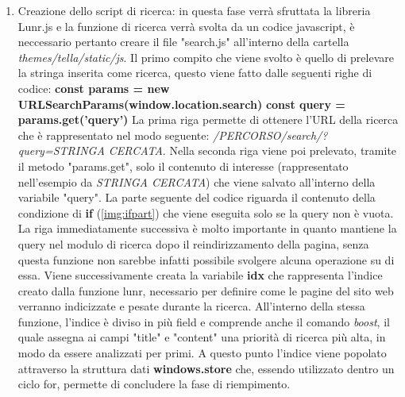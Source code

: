 \documentclass[target=bach,aauheader=]{thud}
\begin{document}
\begin{enumerate}
    \item Creazione dello script di ricerca: in questa fase verrà sfruttata la libreria Lunr.js e la funzione di ricerca verrà svolta da un codice javascript, è neccessario pertanto creare il file "search.js" all'interno della cartella \textit{themes/tella/static/js}.
    \newline \newline 
    Il primo compito che viene svolto è quello di prelevare la stringa inserita come ricerca, questo viene fatto dalle seguenti righe di codice:
    \newline \newline
    \textbf{const params = new URLSearchParams(window.location.search)}
    \newline
    \textbf{const query = params.get('query')}
    \newline \newline
    La prima riga permette di ottenere l'URL della ricerca che è rappresentato nel modo seguente: \textit{/PERCORSO/search/?query=STRINGA CERCATA}.
    \newline
    Nella seconda riga viene poi prelevato, tramite il metodo "params.get", solo il contenuto di interesse (rappresentato nell'esempio da \textit{STRINGA CERCATA}) che viene salvato all'interno della variabile "query".
    \newline \newline
    La parte seguente del codice riguarda il contenuto della condizione di \textbf{if} (\cref{img:ifpart}) che viene eseguita solo se la query non è vuota. La riga immediatamente successiva è molto importante in quanto mantiene la query nel modulo di ricerca dopo il reindirizzamento della pagina, senza questa funzione non sarebbe infatti possibile svolgere alcuna operazione su di essa.
    \newline
    Viene successivamente creata la variabile \textbf{idx} che rappresenta l'indice creato dalla funzione lunr, necessario per definire come le pagine del sito web verranno indicizzate e pesate durante la ricerca.
    \newline
    All'interno della stessa funzione, l'indice è diviso in più field e comprende anche il comando \textit{boost}, il quale assegna ai campi "title" e "content" una priorità di ricerca più alta, in modo da essere analizzati per primi.  
    \newline
    A questo punto l'indice viene popolato attraverso la struttura dati \textbf{windows.store} che, essendo utilizzato dentro un ciclo for, permette di concludere la fase di riempimento.

\end{enumerate}
\end{document}
